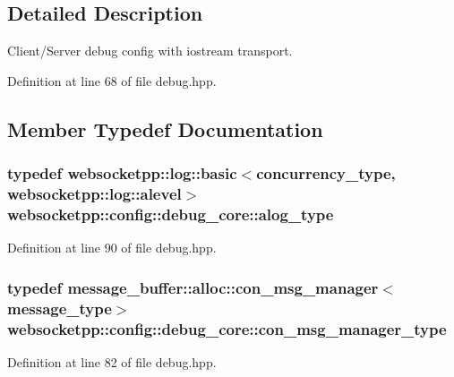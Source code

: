 \subsection{Detailed Description}
Client/\+Server debug config with iostream transport. 

Definition at line 68 of file debug.\+hpp.



\subsection{Member Typedef Documentation}
\hypertarget{structwebsocketpp_1_1config_1_1debug__core_a2e57e38001385110ce0fbbd17af6b0af}{}
\subsubsection[{alog\+\_\+type}]{\setlength{\rightskip}{0pt plus 5cm}typedef {\bf websocketpp\+::log\+::basic}$<${\bf concurrency\+\_\+type}, {\bf websocketpp\+::log\+::alevel}$>$ {\bf websocketpp\+::config\+::debug\+\_\+core\+::alog\+\_\+type}}\label{structwebsocketpp_1_1config_1_1debug__core_a2e57e38001385110ce0fbbd17af6b0af}


Definition at line 90 of file debug.\+hpp.

\hypertarget{structwebsocketpp_1_1config_1_1debug__core_a7054f79ccb00e2269e3c9fa1061126ac}{}
\subsubsection[{con\+\_\+msg\+\_\+manager\+\_\+type}]{\setlength{\rightskip}{0pt plus 5cm}typedef {\bf message\+\_\+buffer\+::alloc\+::con\+\_\+msg\+\_\+manager}$<${\bf message\+\_\+type}$>$ {\bf websocketpp\+::config\+::debug\+\_\+core\+::con\+\_\+msg\+\_\+manager\+\_\+type}}\label{structwebsocketpp_1_1config_1_1debug__core_a7054f79ccb00e2269e3c9fa1061126ac}


Definition at line 82 of file debug.\+hpp.


